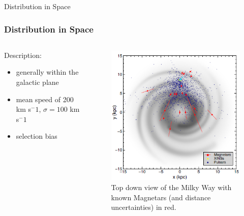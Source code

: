 \documentclass[hyperref=pdftex, presentation]{beamer}
\begin{document}
\begin{frame}{\Large Distribution in Space}
\frametitle{\Large Distribution in Space}

\begin{minipage}[0.2\textheight]{\textwidth}
\begin{columns}[T]
\begin{column}{0.5\textwidth}

\begin{block}{Description:}

\begin{itemize}
 \item<2-> generally within the galactic plane %
 \item<3-> mean speed of 200 km s$^-1$, $\sigma = 100$ km s$^-1$
 \item<4-> selection bias
\end{itemize}
\end{block}
\end{column}
\begin{column}{0.5\textwidth}
	\begin{figure}
		\includegraphics[scale=.5]{figures/spatial.png}
		\caption{Top down view of the Milky Way with known Magnetars (and distance uncertainties) in red.}
	\end{figure}
\end{column}
\end{columns}
\end{minipage}

\end{frame}
\end{document}

